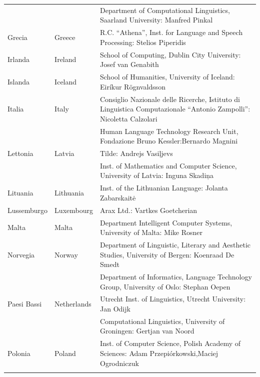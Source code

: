 \begin{longtable}{llp{110mm}}
  & & Department of Computational Linguistics, Saarland University: Manfred Pinkal\\ \addlinespace 
  Grecia & \textcolor{grey1}{Greece} & R.C. “Athena”, Inst. for Language and Speech Processing: Stelios Piperidis\\ \addlinespace
  Irlanda & \textcolor{grey1}{Ireland} & School of Computing, Dublin City University: Josef van Genabith\\ \addlinespace
  Islanda & \textcolor{grey1}{Iceland} & School of Humanities, University of Iceland: Eiríkur Rögnvaldsson\\ \addlinespace
  Italia & \textcolor{grey1}{Italy} & Consiglio Nazionale delle Ricerche, Istituto di Linguistica Computazionale “Antonio Zampolli”: Nicoletta Calzolari\\ \addlinespace
  & & Human Language Technology Research Unit, Fondazione Bruno Kessler:\newline Bernardo Magnini\\ \addlinespace 
  Lettonia & \textcolor{grey1}{Latvia} & Tilde: Andrejs Vasiļjevs\\ \addlinespace 
  & & Inst. of Mathematics and Computer Science, University of Latvia: Inguna Skadiņa\\ \addlinespace
  Lituania & \textcolor{grey1}{Lithuania} & Inst. of the Lithuanian Language: Jolanta Zabarskaitė\\ \addlinespace
  Lussemburgo & \textcolor{grey1}{Luxembourg} & Arax Ltd.: Vartkes Goetcherian\\ \addlinespace
  Malta & \textcolor{grey1}{Malta} & Department Intelligent Computer Systems, University of Malta: Mike Rosner\\ \addlinespace
  Norvegia & \textcolor{grey1}{Norway} & Department of Linguistic,
  Literary and Aesthetic Studies, University of Bergen: Koenraad De Smedt\\ \addlinespace 
  & & Department of Informatics, Language Technology Group, University of Oslo: Stephan Oepen \\ \addlinespace
  Paesi Bassi & \textcolor{grey1}{Netherlands} & Utrecht Inst. of Linguistics, Utrecht University: Jan Odijk\\ \addlinespace 
  & & Computational Linguistics, University of Groningen: Gertjan van Noord\\ \addlinespace
  Polonia & \textcolor{grey1}{Poland} & Inst. of Computer Science, Polish Academy of Sciences: Adam Przepiórkowski,\newline Maciej Ogrodniczuk \\ \addlinespace

\end{longtable}
